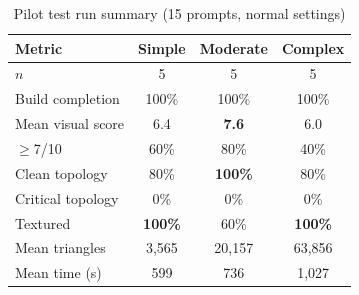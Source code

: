 \documentclass[conference]{IEEEtran}
\begin{document}
\begin{table}[t]
\centering
\caption{Pilot test run summary (15 prompts, normal settings)}
\label{tab:overall}
\begin{tabular}{lccc}
\toprule
Metric & Simple & Moderate & Complex \\
\midrule
$n$ & 5 & 5 & 5 \\
Build completion & 100\% & 100\% & 100\% \\
Mean visual score & 6.4 & \textbf{7.6} & 6.0 \\
$\geq$7/10 & 60\% & 80\% & 40\% \\
Clean topology & 80\% & \textbf{100\%} & 80\% \\
Critical topology & 0\% & 0\% & 0\% \\
Textured & \textbf{100\%} & 60\% & \textbf{100\%} \\
Mean triangles & 3{,}565 & 20{,}157 & 63{,}856 \\
Mean time (s) & 599 & 736 & 1{,}027 \\
\bottomrule
\end{tabular}
\end{table}
\end{document}
